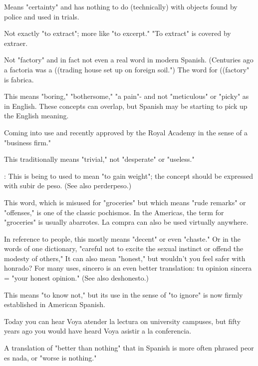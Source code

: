  Means "certainty" and has nothing to do (technically) with objects found by police and used in trials.

 Not exactly "to extract"; more like "to excerpt."
"To extract" is covered by extraer.

 Not "factory" and in fact not even a real word in
modern Spanish. (Centuries ago a factoria was a ((trading house set up
on foreign soil.") The word for ((factory" is fabrica.

 This means "boring," "bothersome," "a pain"-
and not "meticulous" or "picky" as in English. These concepts can
overlap, but Spanish may be starting to pick up the English meaning.

 Coming into use and recently approved by the Royal
Academy in the sense of a "business firm."

 This traditionally means "trivial," not "desperate" or
"useless."

 : This is being to used to mean "to gain
weight"; the concept should be expressed with subir de peso. (See
also perderpeso.)

 This word, which is misused for "groceries" but
which means "rude remarks" or "offenses," is one of the classic pochismos. In the Americas, the term for "groceries" is usually abarrotes. La compra can also be used virtually anywhere.

 In reference to people, this mostly means "decent"
or even "chaste." Or in the words of one dictionary, "careful not to excite the sexual instinct or offend the modesty of others," It can also
mean "honest," but wouldn't you feel safer with honrado? For many
uses, sincero is an even better translation: tu opinion sincera = "your
honest opinion." (See also deshonesto.)

 This means "to know not," but its use in the sense
of "to ignore" is now firmly established in American Spanish.

 Today you can hear Voya atender la lectura on
university campuses, but fifty years ago you would have heard Voya
asistir a la conferencia.

 A translation of "better than nothing"
that in Spanish is more often phrased peor es nada, or "worse is
nothing."

